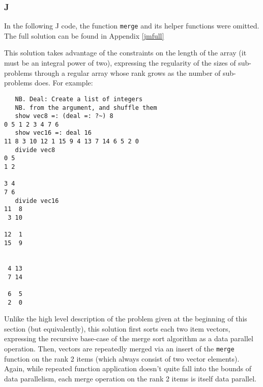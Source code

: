 \subsubsection{J}
\label{jmerge}
In the following J code, the function \texttt{merge} and its helper functions were omitted.
The full solution can be found in Appendix \ref{jmfull}

\begin{singlespacing}
\begin{small}

\end{small}
\end{singlespacing}

This solution takes advantage of the constraints on the length of the array (it must be an integral power of two), 
expressing the regularity of the sizes of sub-problems through a regular array 
whose rank grows as the number of sub-problems does.
For example: 

\begin{singlespacing}
\begin{small}
\begin{verbatim}
   NB. Deal: Create a list of integers
   NB. from the argument, and shuffle them
   show vec8 =: (deal =: ?~) 8
0 5 1 2 3 4 7 6
   show vec16 =: deal 16
11 8 3 10 12 1 15 9 4 13 7 14 6 5 2 0
   divide vec8
0 5
1 2

3 4
7 6
   divide vec16
11  8
 3 10

12  1
15  9


 4 13
 7 14

 6  5
 2  0
\end{verbatim}
\end{small}
\end{singlespacing}

Unlike the high level description of the problem given at the beginning of this section (but equivalently), 
this solution first sorts each two item vectors, 
expressing the recursive base-case of the merge sort algorithm as a data parallel operation.
Then, vectors are repeatedly merged via an insert of the \texttt{merge} function on the rank 2 items 
(which always consist of two vector elements).
Again, while repeated function application doesn't quite fall into the bounds of data parallelism, 
each merge operation on the rank 2 items is itself data parallel.
